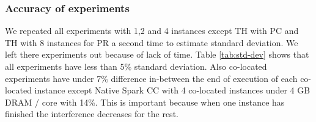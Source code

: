\subsubsection{Accuracy of experiments}

We repeated all experiments with 1,2 and 4 instances except TH with PC and TH with 8 instances for PR a second time to estimate standard deviation. We left there experiments out because of lack of time. Table \ref{tab:std-dev} shows that 
all experiments have less than 5\% standard deviation. Also co-located experiments have under 7\% difference in-between the end of execution of each co-located instance except Native Spark CC with 4 co-located instances under 4 GB DRAM / core with 14\%. This is important because when one instance has finished the interference decreases for the rest.

